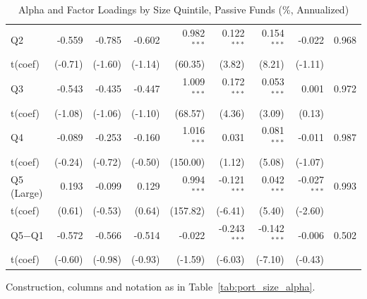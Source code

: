 \begin{table}[!htbp]
{\begin{tabular*}{\linewidth}{@{\extracolsep{\fill}}lrrrrrrrr}
\hspace{1em}Q2 & -0.559 & -0.785 & -0.602 & 0.982$^{***}$ & 0.122$^{***}$ & 0.154$^{***}$ & -0.022 & 0.968\\
\hspace{1em}t(coef) & (-0.71) & (-1.60) & (-1.14) & (60.35) & (3.82) & (8.21) & (-1.11) & \\
\hspace{1em}Q3 & -0.543 & -0.435 & -0.447 & 1.009$^{***}$ & 0.172$^{***}$ & 0.053$^{***}$ & 0.001 & 0.972\\
\hspace{1em}t(coef) & (-1.08) & (-1.06) & (-1.10) & (68.57) & (4.36) & (3.09) & (0.13) & \\
\hspace{1em}Q4 & -0.089 & -0.253 & -0.160 & 1.016$^{***}$ & 0.031 & 0.081$^{***}$ & -0.011 & 0.987\\
\hspace{1em}t(coef) & (-0.24) & (-0.72) & (-0.50) & (150.00) & (1.12) & (5.08) & (-1.07) & \\
\hspace{1em}Q5 (Large) & 0.193 & -0.099 & 0.129 & 0.994$^{***}$ & -0.121$^{***}$ & 0.042$^{***}$ & -0.027$^{***}$ & 0.993\\
\hspace{1em}t(coef) & (0.61) & (-0.53) & (0.64) & (157.82) & (-6.41) & (5.40) & (-2.60) & \\
\hspace{1em}Q5$-$Q1 & -0.572 & -0.566 & -0.514 & -0.022 & -0.243$^{***}$ & -0.142$^{***}$ & -0.006 & 0.502\\
\hspace{1em}t(coef) & (-0.60) & (-0.98) & (-0.93) & (-1.59) & (-6.03) & (-7.10) & (-0.43) & \\
\bottomrule
\end{tabular*}%
}\sbefit
\fi
\setlength{\tabletempwidth}{\wd\tabletempbox}
\ifdim\tabletempwidth>\linewidth\setlength{\tabletempwidth}{\linewidth}\fi
\begin{minipage}{\tabletempwidth}
\captionsetup{width=\linewidth}
\caption{Alpha and Factor Loadings by Size Quintile, Passive Funds (\%, Annualized)}\label{tab:port_size_alpha_passive}
\ifdim\wd\tabletempbox>\linewidth
  \resizebox{\linewidth}{!}{\usebox{\tabletempbox}}
\else
  \usebox{\tabletempbox}
\fi
\par\medskip
\begin{singlespace}\tablefont\noindent
Construction, columns and notation as in Table~\ref{tab:port_size_alpha}.
\end{singlespace}
\end{minipage}
\end{table}

